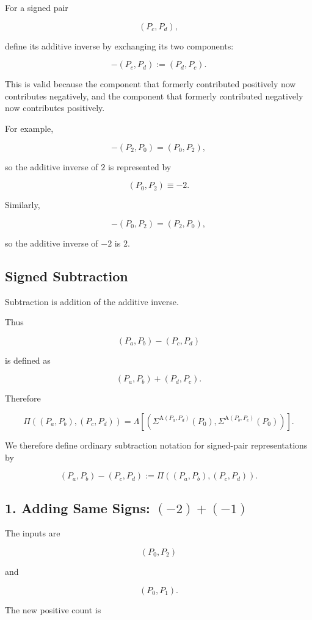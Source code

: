 \documentclass[12pt]{article}
\newcommand{\Alpha}{\mathrm{A}}
\begin{document}
For a signed pair

\[
(P_c,P_d),
\]

define its additive inverse by exchanging its two components:

\[
\boxed{
-(P_c,P_d):=(P_d,P_c).
}
\]

This is valid because the component that formerly contributed positively now contributes negatively, and the component that formerly contributed negatively now contributes positively.

For example,

\[
-(P_2,P_0)
=
(P_0,P_2),
\]

so the additive inverse of \(2\) is represented by

\[
(P_0,P_2)\equiv-2.
\]

Similarly,

\[
-(P_0,P_2)
=
(P_2,P_0),
\]

so the additive inverse of \(-2\) is \(2\).

\subsection*{Signed Subtraction}

Subtraction is addition of the additive inverse.

Thus

\[
(P_a,P_b)-(P_c,P_d)
\]

is defined as

\[
(P_a,P_b)+(P_d,P_c).
\]

Therefore

\[
\boxed{
\Pi
\left(
(P_a,P_b),(P_c,P_d)
\right)
=
\Lambda\left[
\left(
\Sigma^{\Alpha(P_a,P_d)}(P_0),
\Sigma^{\Alpha(P_b,P_c)}(P_0)
\right)
\right].
}
\]

We therefore define ordinary subtraction notation for signed-pair representations by

\[
\boxed{
(P_a,P_b)-(P_c,P_d)
:=
\Pi\left((P_a,P_b),(P_c,P_d)\right).
}
\]

\subsection*{1. Adding Same Signs: \((-2)+(-1)\)}

The inputs are

\[
(P_0,P_2)
\]

and

\[
(P_0,P_1).
\]

The new positive count is
\end{document}
